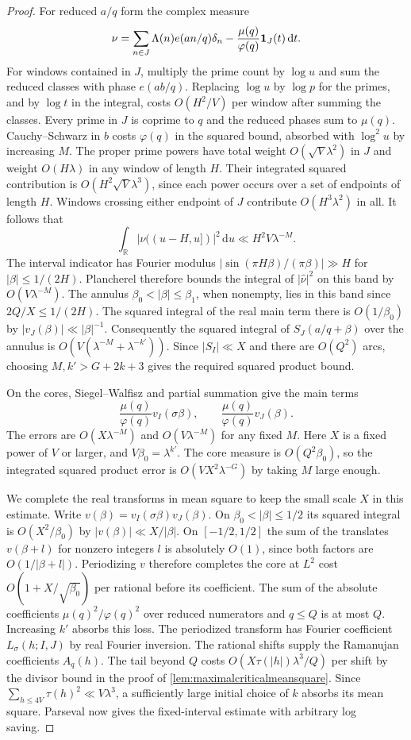 \documentclass[11pt,a4paper]{article}
\numberwithin{equation}{section}
\newcommand{\ud}{\mathrm d}
\begin{document}
\begin{proof}
For reduced $a/q$ form the complex measure
\[
 \nu=\sum_{n\in J}\Lambda(n)e(an/q)\delta_n
       -\frac{\mu(q)}{\varphi(q)}{\bf1}_J(t)\,\ud t .
\]
For windows contained in $J$, multiply the prime count by $\log u$
and sum the reduced classes with phase $e(ab/q)$. Replacing
$\log u$ by $\log p$ for the primes, and by $\log t$ in the
integral, costs $O(H^2/V)$ per window after summing the classes.
Every prime in $J$ is coprime to $q$ and the reduced phases sum
to $\mu(q)$. Cauchy--Schwarz in $b$ costs $\varphi(q)$ in the
squared bound, absorbed with $\log^2 u$ by increasing $M$.
The proper prime powers have total weight $O(\sqrt V\lambda^2)$
in $J$ and weight $O(H\lambda)$ in any window of length $H$.
Their integrated squared contribution is $O(H^2\sqrt V\lambda^3)$,
since each power occurs over a set of endpoints of length $H$.
Windows crossing either endpoint of $J$ contribute $O(H^3\lambda^2)$
in all. It follows that
\[
 \int_{\mathbb R}|\nu((u-H,u])|^2\,\ud u\ll H^2V\lambda^{-M}.
\]
The interval indicator has Fourier modulus
$|\sin(\pi H\beta)/(\pi\beta)|\gg H$ for $|\beta|\le1/(2H)$.
Plancherel therefore bounds the integral of $|\widehat\nu|^2$
on this band by $O(V\lambda^{-M})$.
The annulus $\beta_0<|\beta|\le\beta_1$, when nonempty, lies in
this band since $2Q/X\le1/(2H)$. The squared integral of the
real main term there is $O(1/\beta_0)$ by $|v_J(\beta)|\ll|\beta|^{-1}$.
Consequently the squared integral of $S_J(a/q+\beta)$ over the
annulus is $O(V(\lambda^{-M}+\lambda^{-k'}))$.
Since $|S_I|\ll X$ and there are $O(Q^2)$ arcs, choosing
$M,k'>G+2k+3$ gives the required squared product bound.

On the cores, Siegel--Walfisz and partial summation give the
main terms
\[
 \frac{\mu(q)}{\varphi(q)}v_I(\sigma\beta),\qquad
 \frac{\mu(q)}{\varphi(q)}v_J(\beta).
\]
The errors are $O(X\lambda^{-M})$ and $O(V\lambda^{-M})$ for
any fixed $M$.
Here $X$ is a fixed power of $V$ or larger, and
$V\beta_0=\lambda^{k'}$. The core measure is $O(Q^2\beta_0)$,
so the integrated squared product error is
$O(VX^2\lambda^{-G})$ by taking $M$ large enough.

We complete the real transforms in mean square to keep the
small scale $X$ in this estimate. Write
$v(\beta)=v_I(\sigma\beta)v_J(\beta)$. On
$\beta_0<|\beta|\le1/2$ its squared integral is
$O(X^2/\beta_0)$ by $|v(\beta)|\ll X/|\beta|$.
On $[-1/2,1/2]$ the sum of the translates $v(\beta+l)$ for
nonzero integers $l$ is absolutely $O(1)$, since both factors
are $O(1/|\beta+l|)$. Periodizing $v$ therefore completes the
core at $L^2$ cost $O(1+X/\sqrt{\beta_0})$ per rational before
its coefficient. The sum of the absolute coefficients
$\mu(q)^2/\varphi(q)^2$ over reduced numerators and $q\le Q$
is at most $Q$. Increasing $k'$ absorbs this loss. The
periodized transform has Fourier coefficient $L_\sigma(h;I,J)$
by real Fourier inversion. The rational shifts supply the
Ramanujan coefficients $A_q(h)$. The tail beyond $Q$ costs
$O(X\tau(|h|)\lambda^3/Q)$ per shift by the divisor bound in
the proof of \cref{lem:maximalcriticalmeansquare}. Since
$\sum_{h\le4V}\tau(h)^2\ll V\lambda^3$, a sufficiently large
initial choice of $k$ absorbs its mean square. Parseval now gives
the fixed-interval estimate with arbitrary log saving.


\end{proof}
\end{document}
